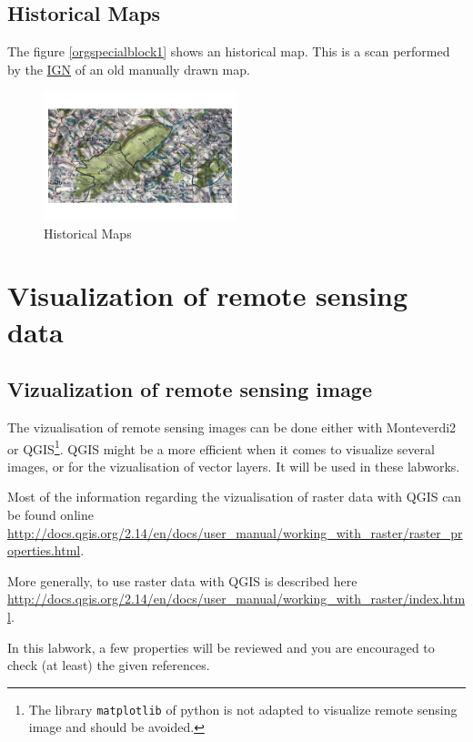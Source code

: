 \documentclass[a4paper,11pt,DIV=18]{scrartcl}
\begin{document}
\subsection{Historical Maps}
\label{sec:orgheadline13}
The figure \ref{orgspecialblock1} shows an historical map. This is a scan performed by
the \href{http://www.ign.fr/}{IGN} of an old manually drawn map.

\begin{figure}[htb]
\centering
\includegraphics[h,width=0.5\textwidth]{figures/old_map.jpg}
\caption{\label{fig:orgparagraph3}
Historical Maps}
\end{figure}

\section{Visualization of remote sensing data}
\label{sec:orgheadline19}
\subsection{Vizualization of remote sensing image}
\label{sec:orgheadline17}
The vizualisation  of remote  sensing images can  be done  either with
Monteverdi2  or QGIS\footnote{The  library \texttt{matplotlib}  of  python is  not
adapted to  visualize remote  sensing image  and should  be avoided.}.
QGIS might  be a  more efficient  when it  comes to  visualize several
images, or for the vizualisation of  vector layers. It will be used in
these labworks.

Most of  the information  regarding the  vizualisation of  raster data
with         QGIS         can          be         found         online
\url{http://docs.qgis.org/2.14/en/docs/user_manual/working_with_raster/raster_properties.html}.

More  generally,  to use  raster  data  with  QGIS is  described  here
\url{http://docs.qgis.org/2.14/en/docs/user_manual/working_with_raster/index.html}.

In  this labwork,  a  few  properties will  be  reviewed  and you  are
encouraged to check (at least) the given references.
\end{document}
